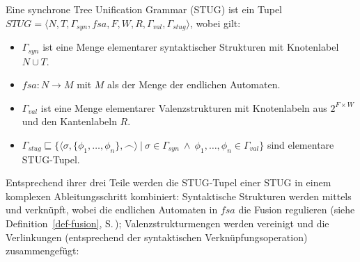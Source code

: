 \begin{definition} Eine synchrone Tree Unification Grammar (STUG) ist ein Tupel
$STUG = \langle N,T, \Gamma_{syn}, \mathit{fsa},F,W,R, \Gamma_{val}, \Gamma_{stug} \rangle$, wobei gilt:
\begin{itemize}
  \item $\Gamma_{syn}$ ist eine Menge elementarer syntaktischer Strukturen mit Knotenlabel $N \cup T$.
  \item $\mathit{fsa}: N \to M$ mit $M$ als der Menge der endlichen Automaten.
  \item $\Gamma_{val}$ ist eine Menge elementarer Valenzstrukturen mit Knotenlabeln aus $2^{F \times W}$ und den Kantenlabeln $R$.
  \item $\Gamma_{stug} \sqsubseteq \{\langle \sigma,\{\phi_1,\ldots,\phi_n\}, \frown\rangle \ | \ \sigma \in \Gamma_{syn} \ \wedge \ \phi_1,\ldots,\phi_n \in \Gamma_{val}\}$ sind elementare STUG-Tupel.  
\end{itemize}
\end{definition}
Entsprechend ihrer drei Teile werden die STUG-Tupel einer STUG in einem komplexen Ableitungsschritt kombiniert: Syntaktische Strukturen werden mittels  und  verknüpft, wobei die endlichen Automaten in $\mathit{fsa}$ die Fusion regulieren (siehe Definition~\ref{def-fusion}, S.\,\pageref{def-fusion}); Valenzstrukturmengen werden vereinigt und die Verlinkungen (entsprechend der syntaktischen Verknüpfungsoperation) zusammengefügt:

